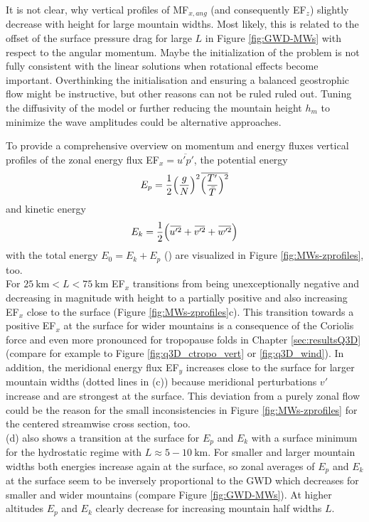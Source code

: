 It is not clear, why vertical profiles of MF$_{x,ang}$ (and consequently EF$_z$) slightly decrease with height for large mountain widths. Most likely, this is related to the offset of the surface pressure drag for large $L$ in Figure \ref{fig:GWD-MWs} with respect to the angular momentum. Maybe the initialization of the problem is not fully consistent with the linear solutions when rotational effects become important. Overthinking the initialisation and ensuring a balanced geostrophic flow might be instructive, but other reasons can not be ruled ruled out. Tuning the diffusivity of the model or further reducing the mountain height $h_m$ to minimize the wave amplitudes could be alternative approaches.

To provide a comprehensive overview on momentum and energy fluxes vertical profiles of the zonal energy flux EF$_x = \overbar{u'p'}$, the potential energy 
\begin{equation}
    E_p = \frac{1}{2} \Bigl(\frac{g}{N}\Bigr)^2 \overbar{\Bigl(\frac{T'}{\bar{T}}\Bigr)^2}
    \label{equ:epot-density}
\end{equation}
and kinetic energy
\begin{equation}
    E_k = \frac{1}{2} \Bigl(\overbar{u'^2} + \overbar{v'^2} + \overbar{w'^2}\Bigr)
    \label{equ:ekin-density}
\end{equation}
with the total energy $E_0 = E_k + E_p$ (\cite[]{tsuda_global_2000}) are visualized in Figure \ref{fig:MWs-zprofiles}, too.\\
For $ \SI{25}{\kilo\meter} < L < \SI{75}{\kilo\meter}$ EF$_x$ transitions from being unexceptionally negative and decreasing in magnitude with height to a partially positive and also increasing EF$_x$ close to the surface (Figure \ref{fig:MWs-zprofiles}c). This transition towards a positive EF$_x$ at the surface for wider mountains is a consequence of the Coriolis force and even more pronounced for tropopause folds in Chapter \ref{sec:resultsQ3D} (compare for example to Figure \ref{fig:q3D_ctropo_vert} or \ref{fig:q3D_wind}). In addition, the meridional energy flux EF$_y$ increases close to the surface for larger mountain widths (dotted lines in (c)) because meridional perturbations $v'$ increase and are strongest at the surface. This deviation from a purely zonal flow could be the reason for the small inconsistencies in Figure \ref{fig:MWs-zprofiles} for the centered streamwise cross section, too.\\
(d) also shows a transition at the surface for $E_p$ and $E_k$ with a surface minimum for the hydrostatic regime with $L \approx 5-\SI{10}{\kilo\meter}$. For smaller and larger mountain widths both energies increase again at the surface, so zonal averages of $E_p$ and $E_k$ at the surface seem to be inversely proportional to the GWD which decreases for smaller and wider mountains (compare Figure \ref{fig:GWD-MWs}). At higher altitudes $E_p$ and $E_k$ clearly decrease for increasing mountain half widths $L$.\\ 
